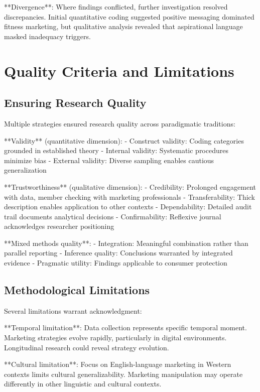 **Divergence**: Where findings conflicted, further investigation resolved discrepancies. Initial quantitative coding suggested positive messaging dominated fitness marketing, but qualitative analysis revealed that aspirational language masked inadequacy triggers.

\section{Quality Criteria and Limitations}
\label{sec:quality}

\subsection{Ensuring Research Quality}

Multiple strategies ensured research quality across paradigmatic traditions:

**Validity** (quantitative dimension):
- Construct validity: Coding categories grounded in established theory
- Internal validity: Systematic procedures minimize bias
- External validity: Diverse sampling enables cautious generalization

**Trustworthiness** (qualitative dimension):
- Credibility: Prolonged engagement with data, member checking with marketing professionals
- Transferability: Thick description enables application to other contexts
- Dependability: Detailed audit trail documents analytical decisions
- Confirmability: Reflexive journal acknowledges researcher positioning

**Mixed methods quality**:
- Integration: Meaningful combination rather than parallel reporting
- Inference quality: Conclusions warranted by integrated evidence
- Pragmatic utility: Findings applicable to consumer protection

\subsection{Methodological Limitations}

Several limitations warrant acknowledgment:

**Temporal limitation**: Data collection represents specific temporal moment. Marketing strategies evolve rapidly, particularly in digital environments. Longitudinal research could reveal strategy evolution.

**Cultural limitation**: Focus on English-language marketing in Western contexts limits cultural generalizability. Marketing manipulation may operate differently in other linguistic and cultural contexts.

